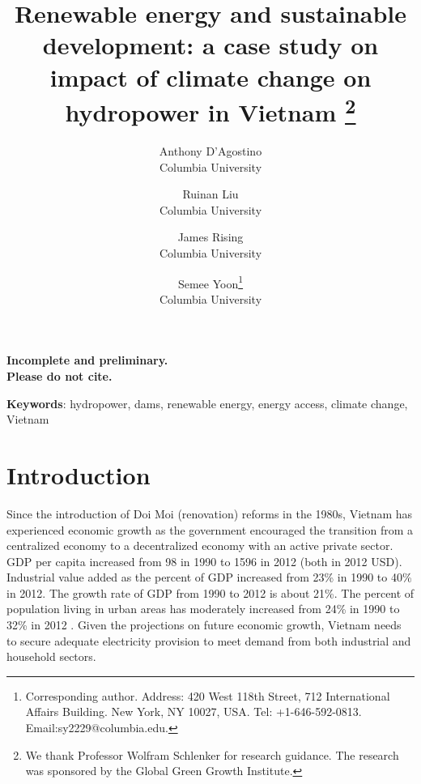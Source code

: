\documentclass[11pt,english]{article}
\theoremstyle{plain} \newtheorem{claim}{Claim}
\theoremstyle{plain} \newtheorem{prop}{Proposition}
\theoremstyle{plain} \newtheorem{hypo}{Hypothesis}
\begin{document}
\title{Renewable energy and sustainable development: a case study on impact of climate change on hydropower in Vietnam \thanks{We thank Professor Wolfram Schlenker for research guidance. The research was sponsored by the Global Green Growth Institute.}}

\author{Anthony D'Agostino\\Columbia University \and Ruinan Liu\\Columbia University \and James Rising\\Columbia University \and Semee Yoon\footnote{Corresponding author. Address: 420 West 118th Street, 712 International Affairs Building. New York, NY 10027, USA. Tel: +1-646-592-0813. Email:sy2229@columbia.edu.}\\Columbia University }

\maketitle

\begin{center}
\textbf{Incomplete and preliminary. \\
Please do not cite. }
\end{center}



\textbf{Keywords}: hydropower, dams, renewable energy, energy access, climate change, Vietnam

\clearpage

\section{Introduction}

	Since the introduction of Doi Moi (renovation) reforms in the 1980s, Vietnam has experienced economic growth as the government encouraged the transition from a centralized economy to a decentralized economy with an active private sector. GDP per capita increased from  98 in 1990 to  1596 in 2012 (both in 2012 USD). Industrial value added as the percent of GDP increased from 23\% in 1990 to 40\% in 2012. The growth rate of GDP from 1990 to 2012 is about 21\%. The percent of population living in urban areas has moderately increased from 24\% in 1990 to 32\% in 2012 \citep{WorldBank2014}. Given the projections on future economic growth, Vietnam needs to secure adequate electricity provision to meet demand from both industrial and household sectors. 
\end{document}
